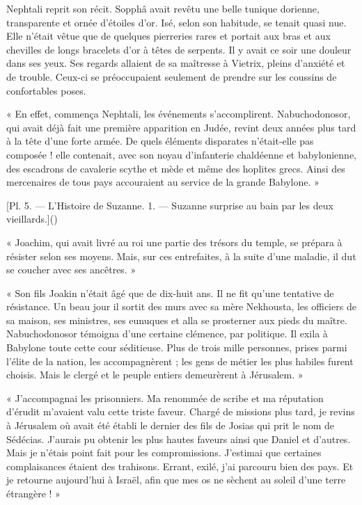 \documentclass[a4paper, 11pt, oneside, polutonikogreek, french]{article}
\begin{document}
\bigskip
\centerline{\EightStarTaper}
\centerline{\EightStarTaper\EightStarTaper}
\bigskip

Nephtali reprit son récit. Sopphâ avait revêtu une belle tunique dorienne, transparente et ornée d'étoiles d'or. Isé, selon son habitude, se tenait quasi nue. Elle n'était vêtue que de quelques pierreries rares et portait aux bras et aux chevilles de longs bracelets d'or à têtes de serpents. Il y avait ce soir une douleur dans ses yeux. Ses regards allaient de sa maîtresse à Vietrix, pleins d'anxiété et de trouble. Ceux-ci se préoccupaient seulement de prendre sur les coussins de confortables poses.

\bigskip
\centerline{\EightStarTaper}
\centerline{\EightStarTaper\EightStarTaper}
\bigskip

« En effet, commença Nephtali, les événements s'accomplirent. Nabuchodonosor, qui avait déjà fait une première apparition en Judée, revint deux années plus tard à la tête d'une forte armée. De quels éléments disparates n'était-elle pas composée ! elle contenait, avec son noyau d'infanterie chaldéenne et babylonienne, des escadrons de cavalerie scythe et mède et même des hoplites grecs. Ainsi des mercenaires de tous pays accouraient au service de la grande Babylone. »

[Pl. 5. --- L'Histoire de Suzanne. 1. --- Suzanne surprise au bain par les deux vieillards.]()

« Joachim, qui avait livré au roi une partie des trésors du temple, se prépara à résister selon ses moyens. Mais, sur ces entrefaites, à la suite d'une maladie, il dut se coucher avec ses ancêtres. »

« Son fils Joakin n'était âgé que de dix-huit ans. Il ne fit qu'une tentative de résistance. Un beau jour il sortit des murs avec sa mère Nekhousta, les officiers de sa maison, ses ministres, ses eunuques et alla se prosterner aux pieds du maître. Nabuchodonosor témoigna d'une certaine clémence, par politique. Il exila à Babylone toute cette cour séditieuse. Plus de trois mille personnes, prises parmi l'élite de la nation, les accompagnèrent ; les gens de métier les plus habiles furent choisis. Mais le clergé et le peuple entiers demeurèrent à Jérusalem. »

« J'accompagnai les prisonniers. Ma renommée de scribe et ma réputation d'érudit m'avaient valu cette triste faveur. Chargé de missions plus tard, je revins à Jérusalem où avait été établi le dernier des fils de Josias qui prit le nom de Sédécias. J'aurais pu obtenir les plus hautes faveurs ainsi que Daniel et d'autres. Mais je n'étais point fait pour les compromissions. J'estimai que certaines complaisances étaient des trahisons. Errant, exilé, j'ai parcouru bien des pays. Et je retourne aujourd'hui à Israël, afin que mes os ne sèchent au soleil d'une terre étrangère ! »
\end{document}
